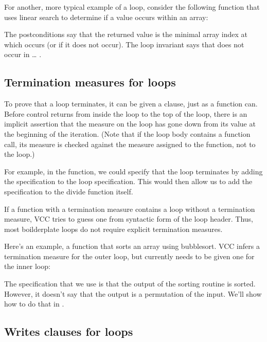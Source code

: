 For another, more typical example of a loop, consider 
the following function that uses linear search to determine if a value
occurs within an array:


\noindent
The postconditions say that the returned value is the minimal array
index at which  occurs (or  if it does not occur).
The loop invariant says that   does not occur in \dots
{}.

\subsection{Termination measures for loops}
\label{sect:loopTermination}
To prove that a loop terminates, it can be given a 
clause, just as a function can. Before control returns from inside the
loop to the top of the loop, there is an implicit assertion that the
measure on the loop has gone down from its value at the beginning of
the iteration. (Note that if the loop body contains a function call,
its measure is checked against the measure assigned to the function,
not to the loop.)

For example, in the  function, we could specify that the
loop terminates by adding the specification  to
the loop specification. This would then allow us to add the
specification  to the divide function itself.

If a function with a termination measure contains a  loop
without a termination measure, VCC tries to guess one from syntactic
form of the loop header. Thus, most boilderplate  loops do
not require explicit termination measures.

Here's an example, a function that sorts an array using
bubblesort. VCC infers a termination measure for the outer loop, but 
currently needs to be given one for the inner loop:


The specification that we use is that the output of the sorting routine is sorted.
However, it doesn't say that the output is a permutation of the input.
We'll show how to do that in .

\subsection{Writes clauses for loops}
\label{sect:sorting}

